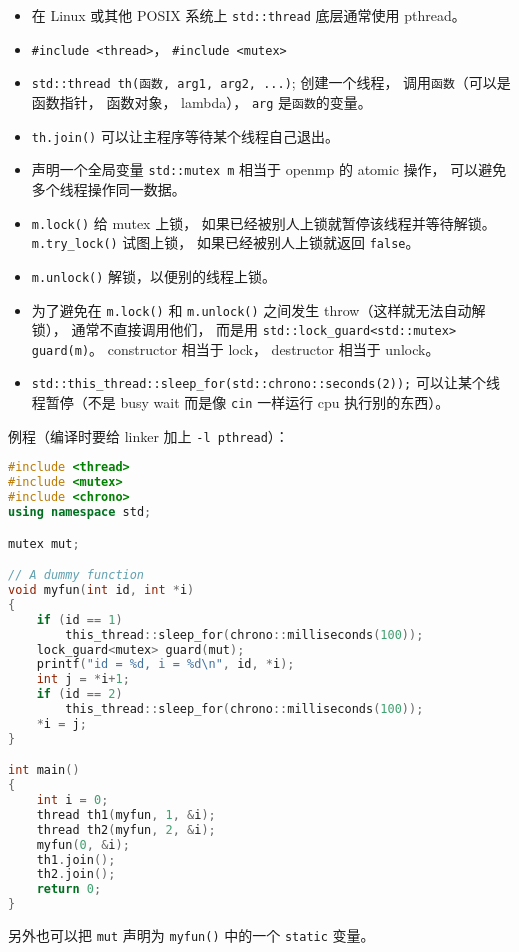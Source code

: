 
\begin{itemize}
\item 在 Linux 或其他 POSIX 系统上 \verb|std::thread| 底层通常使用 pthread。
\item \verb|#include <thread>|， \verb|#include <mutex>|
\item \verb|std::thread th(函数, arg1, arg2, ...)|; 创建一个线程， 调用\verb|函数|（可以是函数指针， 函数对象， lambda）， \verb|arg| 是\verb|函数|的变量。
\item \verb|th.join()| 可以让主程序等待某个线程自己退出。
\item 声明一个全局变量 \verb|std::mutex m| 相当于 openmp 的 atomic 操作， 可以避免多个线程操作同一数据。
\item \verb|m.lock()| 给 mutex 上锁， 如果已经被别人上锁就暂停该线程并等待解锁。 \verb|m.try_lock()| 试图上锁， 如果已经被别人上锁就返回 \verb|false|。
\item \verb|m.unlock()| 解锁，以便别的线程上锁。
\item 为了避免在 \verb|m.lock()| 和 \verb|m.unlock()| 之间发生 throw（这样就无法自动解锁）， 通常不直接调用他们， 而是用 \verb|std::lock_guard<std::mutex> guard(m)|。 constructor 相当于 lock， destructor 相当于 unlock。
\item \verb|std::this_thread::sleep_for(std::chrono::seconds(2));| 可以让某个线程暂停（不是 busy wait 而是像 \verb`cin` 一样运行 cpu 执行别的东西）。
\end{itemize}

例程（编译时要给 linker 加上 \verb|-l pthread|）：
\begin{lstlisting}[language=cpp]
#include <thread>
#include <mutex>
#include <chrono>
using namespace std;

mutex mut;

// A dummy function
void myfun(int id, int *i)
{
    if (id == 1)
        this_thread::sleep_for(chrono::milliseconds(100));
    lock_guard<mutex> guard(mut);
    printf("id = %d, i = %d\n", id, *i);
    int j = *i+1;
    if (id == 2)
        this_thread::sleep_for(chrono::milliseconds(100));
    *i = j;
}

int main()
{
    int i = 0;
    thread th1(myfun, 1, &i);
    thread th2(myfun, 2, &i);
    myfun(0, &i);
    th1.join();
    th2.join();
    return 0;
}
\end{lstlisting}

另外也可以把 \verb|mut| 声明为 \verb|myfun()| 中的一个 \verb|static| 变量。


